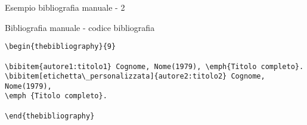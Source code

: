\begin{frame}[fragile]{Esempio bibliografia manuale - 2}

\begin{exampleblock} {Bibliografia manuale - codice bibliografia}
	\begin{lstlisting}
\begin{thebibliography}{9}

\bibitem{autore1:titolo1} Cognome, Nome(1979), \emph{Titolo completo}.
\bibitem[etichetta\_personalizzata]{autore2:titolo2} Cognome, Nome(1979),
\emph {Titolo completo}.

\end{thebibliography}


	\end{lstlisting}
\end{exampleblock}

\end{frame}